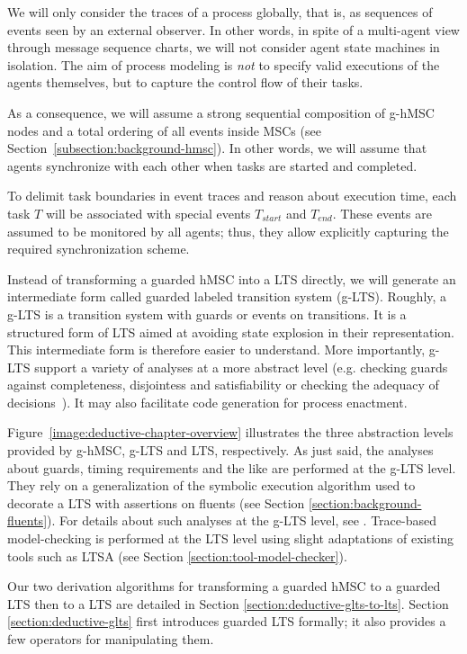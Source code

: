 We will only consider the traces of a process globally, that is, as sequences of events seen by an external observer. In other words, in spite of a multi-agent view through message sequence charts, we will not consider agent state machines in isolation. The aim of process modeling is \emph{not} to specify valid executions of the agents themselves, but to capture the control flow of their tasks. 

As a consequence, we will assume a strong sequential composition of g-hMSC nodes and a total ordering of all events inside MSCs (see Section~\ref{subsection:background-hmsc}). In other words, we will assume that agents synchronize with each other when tasks are started and completed. 

To delimit task boundaries in event traces and reason about execution time, each task $T$ will be associated with special events $T_{start}$ and $T_{end}$. These events are assumed to be monitored by all agents; thus, they allow explicitly capturing the required synchronization scheme.

Instead of transforming a guarded hMSC into a LTS directly, we will generate an intermediate form called guarded labeled transition system (g-LTS). Roughly, a g-LTS is a transition system with guards or events on transitions. It is a structured form of LTS aimed at avoiding state explosion in their representation. This intermediate form is therefore easier to understand. More importantly, g-LTS support a variety of analyses at a more abstract level (e.g. checking guards against completeness, disjointess and satisfiability or checking the adequacy of decisions~\cite{Damas:2011}). It may also facilitate code generation for process enactment.

Figure~\ref{image:deductive-chapter-overview} illustrates the three abstraction levels provided by g-hMSC, g-LTS and LTS, respectively. As just said, the analyses about guards, timing requirements and the like are performed at the g-LTS level. They rely on a generalization of the symbolic execution algorithm used to decorate a LTS with assertions on fluents (see Section \ref{section:background-fluents}). For details about such analyses at the g-LTS level, see \cite{Damas:2011}. Trace-based model-checking is performed at the LTS level using slight adaptations of existing tools such as LTSA \cite{Magee:1999} (see Section \ref{section:tool-model-checker}).

Our two derivation algorithms for transforming a guarded hMSC to a guarded LTS then to a LTS are detailed in Section \ref{section:deductive-glts-to-lts}. Section \ref{section:deductive-glts} first introduces guarded LTS formally; it also provides a few operators for manipulating them.
